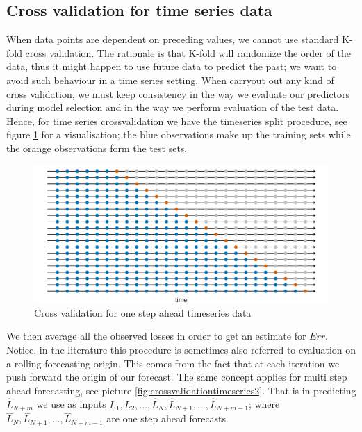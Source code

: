 \subsection{Cross validation for time series data}
When data points are dependent on preceding values, we cannot use standard K-fold cross validation. The rationale is that K-fold will randomize the order of the data, thus it might happen to use future data to predict the past; we want to avoid such behaviour in a time series setting. 
When carryout out any kind of cross validation, we must keep consistency in the way we evaluate our predictors during model selection and in the way we perform evaluation of the test data.
Hence, for time series crossvalidation we have the timeseries split procedure, see figure \ref{fig:crossvalidationtimeseries} for a visualisation; the blue observations make up the training sets while the orange observations form the test sets.
\begin{figure}
    \includegraphics[width=\textwidth]{images/crossvalidationtimeseries.png}
    \caption{Cross validation for one step ahead timeseries data \cite{hyndman2018forecasting}}
    \label{fig:crossvalidationtimeseries}
\end{figure}
We then average all the observed losses in order to get an estimate for $Err$.
Notice, in the literature this procedure is sometimes also referred to evaluation on a rolling forecasting origin. This comes from the fact that at each iteration we push forward the origin of our forecast.
The same concept applies for multi step ahead forecasting, see picture \ref{fig:crossvalidationtimeseries2}.
That is in predicting $\hat{L}_{N+m}$ we use as inputs $L_1, L_2, \dots, \hat{L}_{N},\hat{L}_{N+1},\dots, \hat{L}_{N+m-1}$; where $\hat{L}_{N},\hat{L}_{N+1},\dots, \hat{L}_{N+m-1}$ are one step ahead forecasts.
